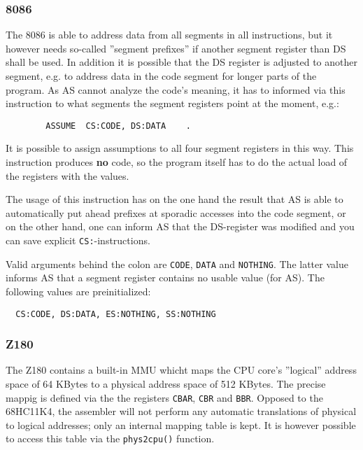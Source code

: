 \documentclass[12pt,twoside]{report}
\newcommand{\bb}[1]{{\bf #1}}
\newcommand{\tty}[1]{{\tt #1}}
\begin{document}

\subsubsection{8086}

The 8086 is able to address data from all segments in all
instructions, but it however needs so-called ''segment prefixes'' if
another segment register than DS shall be used.  In addition it is
possible that the DS register is adjusted to another segment, e.g. to
address data in the code segment for longer parts of the program.  As
AS cannot analyze the code's meaning, it has to informed via this
instruction to what segments the segment registers point at the
moment, e.g.:
\begin{verbatim}
        ASSUME  CS:CODE, DS:DATA    .
\end{verbatim}
It is possible to assign assumptions to all four segment registers in
this way.  This instruction produces \bb{no} code, so the program itself
has to do the actual load of the registers with the values.

The usage of this instruction has on the one hand the result that AS is
able to automatically put ahead prefixes at sporadic accesses into the
code segment, or on the other hand, one can inform AS that the DS-register
was modified and you can save explicit \tty{CS:}-instructions.

Valid arguments behind the colon are \tty{CODE}, \tty{DATA} and
\tty{NOTHING}.  The latter value informs AS that a segment register
contains no usable value (for AS).  The following values are
preinitialized:
\begin{verbatim}
  CS:CODE, DS:DATA, ES:NOTHING, SS:NOTHING
\end{verbatim}


\subsubsection{Z180}

The Z180 contains a built-in MMU whicht maps the CPU core's ''logical''
address space of 64 KBytes to a physical address space of 512 KBytes.  The
precise mappig is defined via the the registers {\tt CBAR}, {\tt CBR} and
{\tt BBR}.  Opposed to the 68HC11K4, the assembler will not perform any 
automatic translations of physical to logical addresses; only an internal
mapping table is kept.  It is however possible to access this table via
the {\tt phys2cpu()} function.
\end{document}
